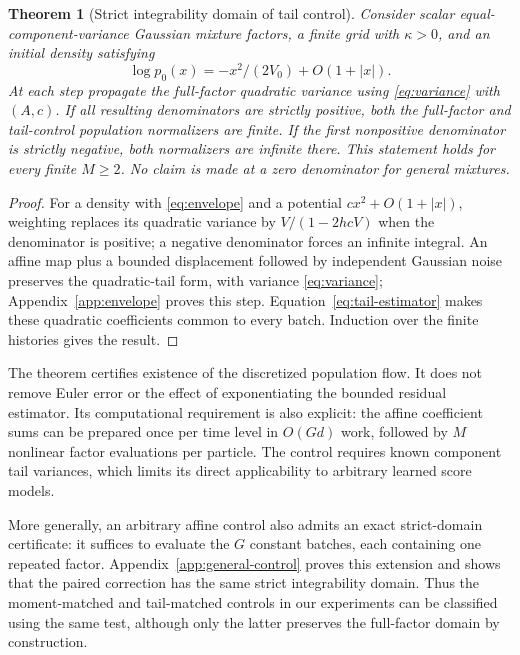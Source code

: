 \documentclass{article}
\newtheorem{theorem}{Theorem}
\begin{document}
\begin{theorem}[Strict integrability domain of tail control]\label{thm:tail}
Consider scalar equal-component-variance Gaussian mixture factors, a finite grid with $\kappa>0$, and an initial density satisfying
\begin{equation}\label{eq:envelope}
 \log p_0(x)=-x^2/(2V_0)+O(1+|x|).
\end{equation}
At each step propagate the full-factor quadratic variance using \eqref{eq:variance} with $(A,c)$. If all resulting denominators are strictly positive, both the full-factor and tail-control population normalizers are finite. If the first nonpositive denominator is strictly negative, both normalizers are infinite there. This statement holds for every finite $M\ge2$. No claim is made at a zero denominator for general mixtures.
\end{theorem}
\begin{proof}
For a density with \eqref{eq:envelope} and a potential $cx^2+O(1+|x|)$, weighting replaces its quadratic variance by $V/(1-2hcV)$ when the denominator is positive; a negative denominator forces an infinite integral. An affine map plus a bounded displacement followed by independent Gaussian noise preserves the quadratic-tail form, with variance \eqref{eq:variance}; Appendix~\ref{app:envelope} proves this step. Equation~\eqref{eq:tail-estimator} makes these quadratic coefficients common to every batch. Induction over the finite histories gives the result.
\end{proof}

The theorem certifies existence of the discretized population flow. It does not remove Euler error or the effect of exponentiating the bounded residual estimator. Its computational requirement is also explicit: the affine coefficient sums can be prepared once per time level in $O(Gd)$ work, followed by $M$ nonlinear factor evaluations per particle. The control requires known component tail variances, which limits its direct applicability to arbitrary learned score models.

More generally, an arbitrary affine control also admits an exact strict-domain certificate: it suffices to evaluate the $G$ constant batches, each containing one repeated factor. Appendix~\ref{app:general-control} proves this extension and shows that the paired correction has the same strict integrability domain. Thus the moment-matched and tail-matched controls in our experiments can be classified using the same test, although only the latter preserves the full-factor domain by construction.
\end{document}
